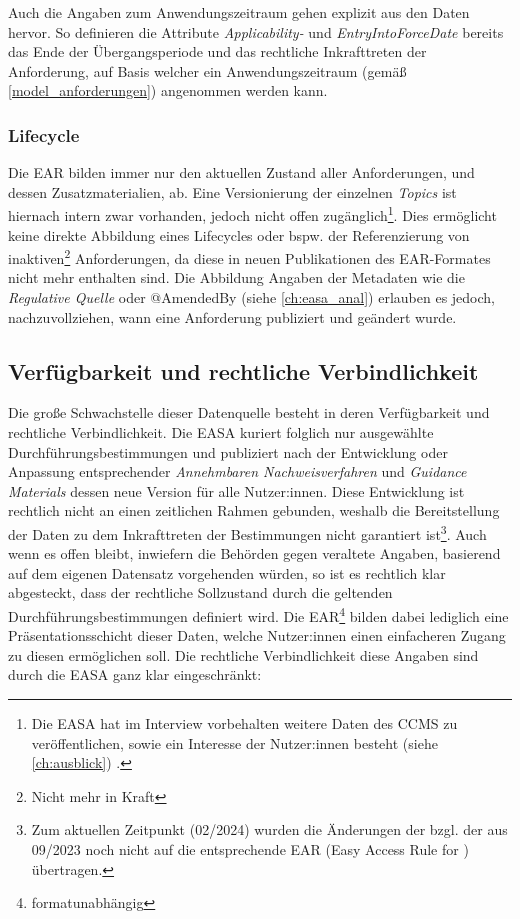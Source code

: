     Auch die Angaben zum Anwendungszeitraum gehen explizit aus den Daten hervor. 
    So definieren die Attribute \textit{Applicability-} und \textit{EntryIntoForceDate} bereits das Ende der Übergangsperiode und das rechtliche Inkrafttreten der Anforderung, auf Basis welcher ein Anwendungszeitraum (gemäß \ref{model_anforderungen}) angenommen werden kann.

\subsubsection{Lifecycle}
    
    Die \ac{EAR} bilden immer nur den aktuellen Zustand aller Anforderungen, und dessen Zusatzmaterialien, ab.
    Eine Versionierung der einzelnen \textit{Topics} ist hiernach intern zwar vorhanden, jedoch nicht offen zugänglich\footnote{Die \ac{EASA} hat im Interview vorbehalten weitere Daten des \ac{CCMS} zu veröffentlichen, sowie ein Interesse der Nutzer:innen besteht (siehe \ref{ch:ausblick}) \cite{easa_xml_export}.}.
    Dies ermöglicht keine direkte Abbildung eines Lifecycles oder bspw. der Referenzierung von inaktiven\footnote{Nicht mehr in Kraft} Anforderungen, da diese in neuen Publikationen des \ac{EAR}-Formates nicht mehr enthalten sind.
    Die Abbildung 
    Angaben der Metadaten wie die \textit{Regulative Quelle} oder @AmendedBy (siehe \ref{ch:easa_anal}) erlauben es jedoch, nachzuvollziehen, wann eine Anforderung publiziert und geändert wurde.
    
\subsection{Verfügbarkeit und rechtliche Verbindlichkeit}

    Die große Schwachstelle dieser Datenquelle besteht in deren Verfügbarkeit und rechtliche Verbindlichkeit.
    Die \ac{EASA} kuriert folglich nur ausgewählte Durchführungsbestimmungen und publiziert nach der Entwicklung oder Anpassung entsprechender \textit{Annehmbaren Nachweisverfahren} und \textit{Guidance Materials} dessen neue Version für alle Nutzer:innen.
    Diese Entwicklung ist rechtlich nicht an einen zeitlichen Rahmen gebunden, weshalb die Bereitstellung der Daten zu dem Inkrafttreten der Bestimmungen nicht garantiert ist\footnote{Zum aktuellen Zeitpunkt (02/2024) wurden die Änderungen der  bzgl. der  aus 09/2023 noch nicht auf die entsprechende \ac{EAR} (Easy Access Rule for \atmans) übertragen.}.
    Auch wenn es offen bleibt, inwiefern die Behörden gegen veraltete Angaben, basierend auf dem eigenen Datensatz vorgehenden würden, so ist es rechtlich klar abgesteckt, dass der rechtliche Sollzustand durch die geltenden Durchführungsbestimmungen definiert wird.
    Die \ac{EAR}\footnote{formatunabhängig} bilden dabei lediglich eine Präsentationsschicht dieser Daten, welche Nutzer:innen einen einfacheren Zugang zu diesen ermöglichen soll. 
    Die rechtliche Verbindlichkeit diese Angaben sind durch die \ac{EASA} ganz klar eingeschränkt:
    

